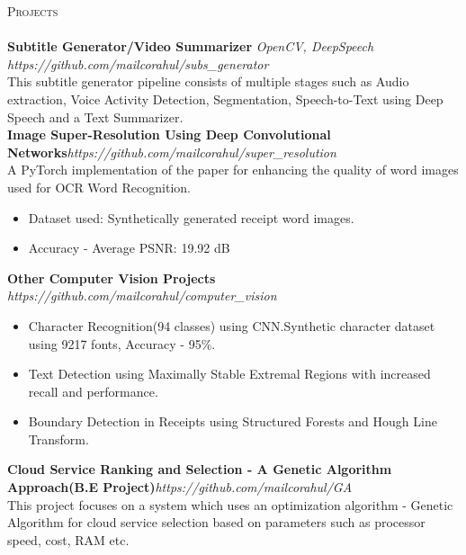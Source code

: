 \documentclass[a4paper]{article}
\newcommand{\lineunder} {
    \vspace*{-8pt} \\
    \hspace*{-18pt} \hrulefill \\
}
\newcommand{\header} [1] {
    {\hspace*{-18pt}\vspace*{6pt} \textsc{#1}}
    \vspace*{-6pt} \lineunder
}
\begin{document}
\header{Projects}
{\textbf{Subtitle Generator/Video Summarizer}} {\sl OpenCV, DeepSpeech} \hfill \textit{https://github.com/mailcorahul/subs\_generator}\\
This subtitle generator pipeline consists of multiple stages such as Audio extraction, Voice Activity Detection, Segmentation, Speech-to-Text using Deep Speech and a Text Summarizer.\\
\vspace*{2mm}
{\textbf{Image Super-Resolution Using Deep Convolutional Networks}}\hfill \textit{https://github.com/mailcorahul/super\_resolution}\\
A PyTorch implementation of the paper for enhancing the quality of word images used for OCR Word Recognition.\\
    \begin{itemize}
        \itemsep-0.5em
        \item Dataset used: Synthetically generated receipt word images.
        \item Accuracy - Average PSNR: 19.92 dB
    \end{itemize}

\vspace*{2mm}
{\textbf{Other Computer Vision Projects}} \\ \textit{https://github.com/mailcorahul/computer\_vision}\\

    \begin{itemize}
        \itemsep-0.5em
        \item Character Recognition(94 classes) using CNN.Synthetic character dataset using 9217 fonts, Accuracy - 95\%.
        \item Text Detection using Maximally Stable Extremal Regions with increased recall and performance.
        \item Boundary Detection in Receipts using Structured Forests and Hough Line Transform.\\
    \end{itemize}
\vspace*{2mm}
{\textbf{Cloud Service Ranking and Selection - A Genetic Algorithm Approach(B.E Project)}}\hfill \textit{https://github.com/mailcorahul/GA}\\
This project focuses on a system which uses an optimization algorithm - Genetic Algorithm for cloud service selection based on parameters such as processor speed, cost, RAM etc.\\
\vspace*{2mm}
\end{document}
